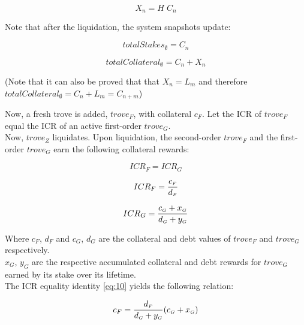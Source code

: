 \documentclass[reqno]{article}
\begin{document}
\begin{equation} \label{eq:47}
    X_n=H \; C_n
\end{equation}

\bigskip
Note that after the liquidation, the system snapshots update:

\begin{equation} \label{eq:8}
    totalStakes_\emptyset=C_n
\end{equation}

\begin{equation} \label{eq:9}
    totalCollateral_\emptyset=C_n+X_n
\end{equation}

\bigskip
(Note that it can also be proved that that $X_n=L_m$ and therefore $totalCollateral_\emptyset=C_n+L_m=C_{n+m}$)

\bigskip
Now, a fresh trove is added, $trove_F$, with collateral $c_F$.  Let the ICR of $trove_F$ equal the ICR of an active first-order $trove_G$.\\

Now, $trove_Z$ liquidates. Upon liquidation, the second-order $trove_F$ and the first-order $trove_G$ earn the following collateral rewards:

\begin{equation} \label{eq:10}
    ICR_F=ICR_G
\end{equation}

\begin{equation} 
    ICR_F=\frac{c_\mathsmaller{F}}{d_\mathsmaller{F}}
\end{equation}

\begin{equation} 
    ICR_G=\frac{c_\mathsmaller{G}+x_\mathsmaller{G}}{d_\mathsmaller{G}+y_\mathsmaller{G}}
\end{equation}

\bigskip
Where $c_F$, $d_F$ and $c_G$, $d_G$ are the collateral and debt values of $trove_F$ and $trove_G$ respectively.\\

$x_G$, $y_G$ are the respective accumulated collateral and debt rewards for $trove_G$ earned by its stake over its lifetime.\\

The ICR equality identity \ref{eq:10} yields the following relation:

\begin{equation} 
        c_F=\frac{d_\mathsmaller{F}}{d_\mathsmaller{G}+y_\mathsmaller{G}}(c_\mathsmaller{G}+x_\mathsmaller{G})
\end{equation}
\end{document}
